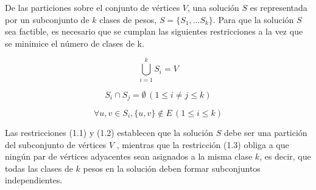 De las particiones sobre el conjunto de vértices $V$, una solución $S$ es representada por un subconjunto de $k$ clases de pesos, $S = \{S_{1}, ... S_{k}\}$. Para que la solución $S$ sea factible, es necesario que se cumplan las siguientes restricciones a la vez que se minimice el número de clases de k.

\newpage
\begin{equation}
	\displaystyle \bigcup_{i = 1} ^ {k} S_{i} = V
\end{equation}

\begin{equation}
	\displaystyle S_{i} \cap S_{j} = \emptyset \, (1 \leq i \neq j \leq k)
\end{equation}

\begin{equation}
	\displaystyle \forall u, v \in S_{i}, \{u, v\} \notin E \, (1 \leq i \leq k)
\end{equation}

Las restricciones (1.1) y (1.2) establecen que la solución $S$ debe ser una partición del subconjunto de vértices $V$ , mientras que la restricción (1.3) obliga a que ningún par de vértices adyacentes sean asignados a la misma clase $k$, es decir, que todas las clases de $k$ pesos en la solución deben formar subconjuntos independientes.


